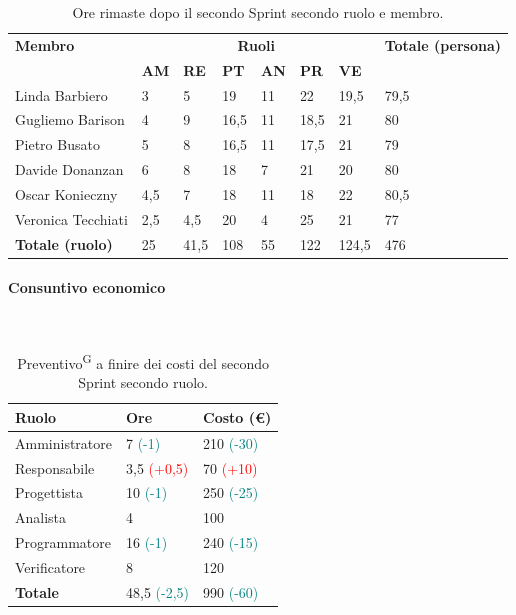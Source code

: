 \documentclass[8pt]{article}
\newcommand{\glossterm}[1]{#1\textsuperscript{G}} %
\newcommand{\subsubsubsection}[1]{\paragraph{#1}\mbox{}\\}
\begin{document}
\begin{table}[ht!]
	\centering
	\begin{tabular}{p{4cm} p{1cm} p{1cm} p{1cm} p{1cm} p{1cm} p{1cm} p{3cm}}
		\toprule
        \textbf{Membro} & \multicolumn{6}{c}{\textbf{Ruoli}} & \textbf{Totale (persona)}\\
		& \textbf{AM} & \textbf{RE} & \textbf{PT} & \textbf{AN} & \textbf{PR} & \textbf{VE}\\
		\midrule
        Linda Barbiero & 3 & 5 & 19 & 11 & 22 & 19,5 & 79,5 \\ 
        Gugliemo Barison & 4 & 9 & 16,5 & 11 & 18,5 & 21 & 80 \\ 
        Pietro Busato & 5 & 8 & 16,5 & 11 & 17,5 & 21 & 79 \\ 
        Davide Donanzan & 6 & 8 & 18 & 7 & 21 & 20 & 80 \\ 
        Oscar Konieczny & 4,5 & 7 & 18 & 11 & 18 & 22 & 80,5 \\ 
        Veronica Tecchiati & 2,5 & 4,5 & 20 & 4 & 25 & 21 & 77 \\ 
        \midrule
        \textbf{Totale (ruolo)} & 25 & 41,5 & 108 & 55 & 122 & 124,5 & 476 \\ 
        \bottomrule
    \end{tabular}
	\caption{Ore rimaste dopo il secondo Sprint secondo ruolo e membro.}
	\label{table:Ore rimaste dopo il secondo Sprint secondo ruolo e membro}
\end{table}
\subsubsubsection{Consuntivo economico}
\begin{table}[ht!]
	\centering
	\begin{tabular}{p{4cm} p{3cm} p{4cm}}
        \toprule
        \textbf{Ruolo} & \textbf{Ore} & \textbf{Costo (€)} \\
        \midrule
        Amministratore & 7 \textcolor{teal}{(-1)}& 210 \textcolor{teal}{(-30)} \\ 
        Responsabile & 3,5  \textcolor{red}{(+0,5)} & 70  \textcolor{red}{(+10)} \\ 
        Progettista & 10 \textcolor{teal}{(-1)}& 250 \textcolor{teal}{(-25)} \\ 
        Analista & 4 & 100 \\ 
        Programmatore & 16 \textcolor{teal}{(-1)}& 240 \textcolor{teal}{(-15)} \\ 
        Verificatore & 8 & 120 \\ 
        \midrule
        \textbf{Totale} & 48,5  \textcolor{teal}{(-2,5)} & 990  \textcolor{teal}{(-60)} \\ 
    \bottomrule
    \end{tabular}
    \caption{\glossterm{Preventivo} a finire dei costi del secondo Sprint secondo ruolo.}
	\label{table:Preventivo a finire dei costi del secondo Sprint secondo ruolo}
\end{table}
\end{document}
